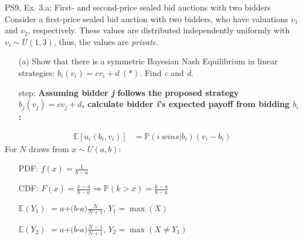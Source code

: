 \begin{frame}{PS9, Ex. 3.a: First- and second-price sealed bid auctions with two bidders}
    Consider a first-price sealed bid auction with two bidders, who have valuations $v_1$ and $v_2$, respectively. These values are distributed independently uniformly with $v_i\sim U(1,3)$, thus, the values are \textit{private}.
    \vspace{-4pt}
    \begin{itemize}
      \item[(a)] Show that there is a symmetric Bayesian Nash Equilibrium in linear strategies: $b_i(v_i) = cv_i + d\ (*)$. Find \textit{c} and \textit{d}.
    \end{itemize}
    \vspace{-8pt}
    \begin{multicols}{2}
      \begin{itemize}
        \item[\nth{1} step:] \textbf{Assuming bidder \textit{j} follows the proposed strategy $b_j(v_j) = cv_j + d$, calculate bidder \textit{i}'s expected payoff from bidding $b_i$:}
      \end{itemize}
      \vspace{-4pt}
      \begin{align*}
        \mathbb{E}[u_i(b_i,v_i)]&=\mathbb{P}(i\ wins|b_i)(v_i-b_i)
      \end{align*}
      \vfill\null\columnbreak
      For $N$ draws from $x\sim U(a, b):$
      \vspace{-6pt}
      \begin{enumerate}
        \item[PDF:] $f(x)=\frac{1}{b-a}$
        \item[CDF:] $F(x)=\frac{x-a}{b-a}\Rightarrow\mathbb{P}(k>x)=\frac{k-a}{b-a}$
        \item[$\mathbb{E}(Y_1)$] $=a$+$(b$-$a)\frac{N}{N+1}$, $Y_1=\max(X)$
        \item[$\mathbb{E}(Y_2)$] $=a$+$(b$-$a)\frac{N-1}{N+1}$, $Y_2=\max(X\neq Y_1)$
      \end{enumerate}
      \vfill\null
    \end{multicols}
\end{frame}
